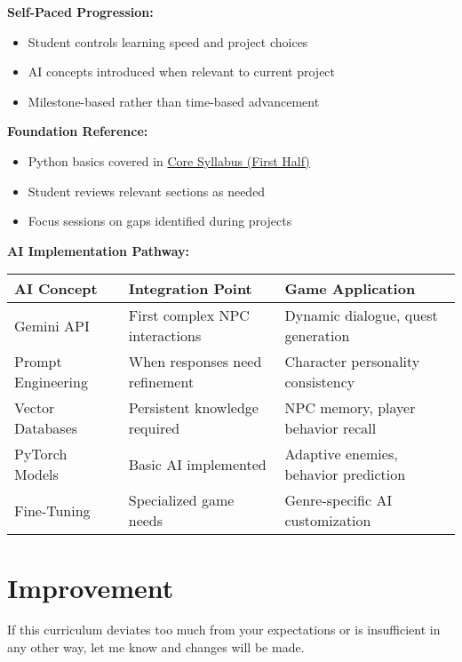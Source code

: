 \documentclass{article}
\begin{document}
\begin{learningblock}
\textbf{Self-Paced Progression:}
\begin{itemize}[nosep]
    \item Student controls learning speed and project choices
    \item AI concepts introduced when relevant to current project
    \item Milestone-based rather than time-based advancement
\end{itemize}

\textbf{Foundation Reference:}
\begin{itemize}[nosep]
    \item Python basics covered in \href{https://codeabode.co/Syllabus.pdf}{Core Syllabus (First Half)}
    \item Student reviews relevant sections as needed
    \item Focus sessions on gaps identified during projects
\end{itemize}

\textbf{AI Implementation Pathway:}
\begin{center}
\small
\begin{tabular}{p{3.5cm} p{3cm} p{6cm}}
\textbf{AI Concept} & \textbf{Integration Point} & \textbf{Game Application} \\
\hline
Gemini API & First complex NPC interactions & Dynamic dialogue, quest generation \\
\hline
Prompt Engineering & When responses need refinement & Character personality consistency \\
\hline
Vector Databases & Persistent knowledge required & NPC memory, player behavior recall \\
\hline
PyTorch Models & Basic AI implemented & Adaptive enemies, behavior prediction \\
\hline
Fine-Tuning & Specialized game needs & Genre-specific AI customization \\
\end{tabular}
\end{center}
\end{learningblock}

\section{Improvement}
If this curriculum deviates too much from your expectations or is insufficient in any other way, let me know and changes will be made. 
\end{document}
